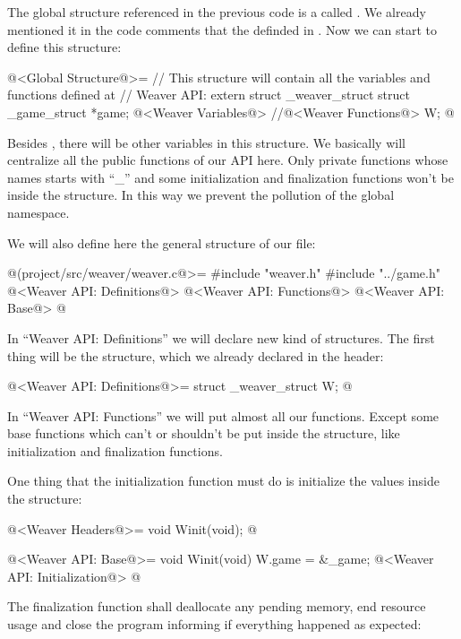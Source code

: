 
The global structure referenced in the previous code is a
 called . We already mentioned it
in the code comments that the
 definded in
. Now we can start to define this structure:

\iniciocodigo
@<Global Structure@>=
// This structure will contain all the variables and functions defined at
// Weaver API:
extern struct _weaver_struct{
  struct _game_struct *game;
  @<Weaver Variables@>
  //@<Weaver Functions@>
} W;
@
\fimcodigo

Besides , there will be other variables in this
structure. We basically will centralize all the public functions of
our API here. Only private functions whose names starts with ``\_''
and some initialization and finalization functions won't be inside
the  structure. In this way we prevent the pollution of
the global namespace.

We will also define here the general structure of
our  file:

\iniciocodigo
@(project/src/weaver/weaver.c@>=
#include "weaver.h"
#include "../game.h"
@<Weaver API: Definitions@>
@<Weaver API: Functions@>
@<Weaver API: Base@>
@
\fimcodigo

In ``Weaver API: Definitions'' we will declare new kind of structures.
The first thing will be the  structure, which we already
declared in the header:

\iniciocodigo
@<Weaver API: Definitions@>=
struct _weaver_struct W;
@
\fimcodigo

In ``Weaver API: Functions'' we will put almost all our
functions. Except some base functions which can't or shouldn't be put
inside the  structure, like initialization and
finalization functions.


One thing that the initialization function must do is initialize the
values inside the   structure:

\iniciocodigo
@<Weaver Headers@>=
void Winit(void);
@
\fimcodigo

\iniciocodigo
@<Weaver API: Base@>=
void Winit(void){
  W.game = &_game;
  @<Weaver API: Initialization@>
}
@
\fimcodigo

The finalization function shall deallocate any pending memory, end
resource usage and close the program informing if everything happened
as expected:

